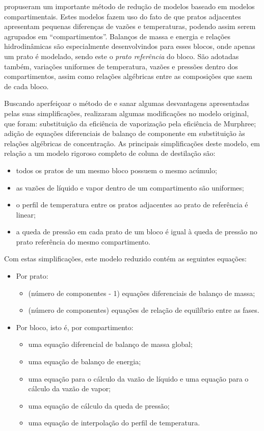  propuseram um importante método de redução de modelos baseado em modelos
compartimentais. Estes modelos fazem uso do fato de que pratos adjacentes apresentam pequenas diferenças de vazões
e temperaturas, podendo assim serem agrupados em ``compartimentos''. Balanços de massa e energia e relações
hidrodinâmicas são especialmente desenvolvindos para esses blocos, onde apenas um prato é modelado, sendo este o
\textit{prato referência} do bloco. São adotadas também, variações uniformes de temperatura, vazões e pressões dentro
dos compartimentos, assim como relações algébricas entre as composições que saem de cada bloco.

Buscando aperfeiçoar o método de  e sanar algumas desvantagens apresentadas pelas suas
simplificações,  realizaram algumas modificações no modelo original, que foram: substituição da
eficiência de vaporização pela eficiência de Murphree; adição de equações diferenciais de
balanço de componente em substituição às relações algébricas de concentração. As principais simplificações deste modelo,
em relação a um modelo rigoroso completo de coluna de destilação são:
\begin{itemize}
\item todos os pratos de um mesmo bloco possuem o mesmo acúmulo;
\item as vazões de líquido e vapor dentro de um compartimento são uniformes;
\item o perfil de temperatura entre os pratos adjacentes ao prato de referência é linear;
\item a queda de pressão em cada prato de um bloco é igual à queda de pressão no prato referência do mesmo compartimento.
\end{itemize}

Com estas simplificações, este modelo reduzido contém as seguintes equações:
\begin{itemize}
\item Por prato:
	\begin{itemize}
	\item (número de componentes - 1) equações diferenciais de balanço de massa;
	\item (número de componentes) equações de relação de equilíbrio entre as fases.
	\end{itemize}
\item Por bloco, isto é, por compartimento:
	\begin{itemize}
	\item uma equação diferencial de balanço de massa global;
	\item uma equação de balanço de energia;
	\item uma equação para o cálculo da vazão de líquido e uma equação para o cálculo da vazão de vapor;
	\item uma equação de cálculo da queda de pressão;
	\item uma equação de interpolação do perfil de temperatura.
	\end{itemize}
\end{itemize}

